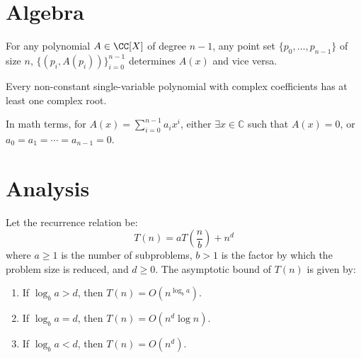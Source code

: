 
\chapter{Algebra}

\begin{theorem}
	\label{lem:interpolation}
	For any polynomial \( A \in \CC[X] \) of degree \( n-1 \), any point set \( \{p_0, \ldots, p_{n-1}\} \) of size \( n \), \( \{(p_i, A(p_i))\}_{i=0}^{n-1} \) determines \( A(x) \) and vice versa.
\end{theorem}

\begin{theorem}
	\label{thm:fundamental-algebra}
	Every non-constant single-variable polynomial with complex coefficients has at least one complex root.

	In math terms, for $A(x) = \sum_{i=0}^{n-1} a_i x^i$, either $\exists x \in \mathbb C$ such that $A(x) = 0$, or $a_0 = a_1 = \cdots = a_{n-1} = 0$.
\end{theorem}

\chapter{Analysis}

\begin{theorem}
	\label{lem:master-sim}
	Let the recurrence relation be:
	\[ T(n) = aT\left(\frac{n}{b}\right) + n^d \]
	where $a \ge 1$ is the number of subproblems, $b > 1$ is the factor by which the problem size is reduced, and $d \ge 0$. The asymptotic bound of $T(n)$ is given by:

	\begin{enumerate}
		\item If $\log_b a > d$, then $T(n) = O(n^{\log_b a})$.
		\item If $\log_b a = d$, then $T(n) = O(n^d \log n)$.
		\item If $\log_b a < d$, then $T(n) = O(n^d)$.
	\end{enumerate}
\end{theorem}

